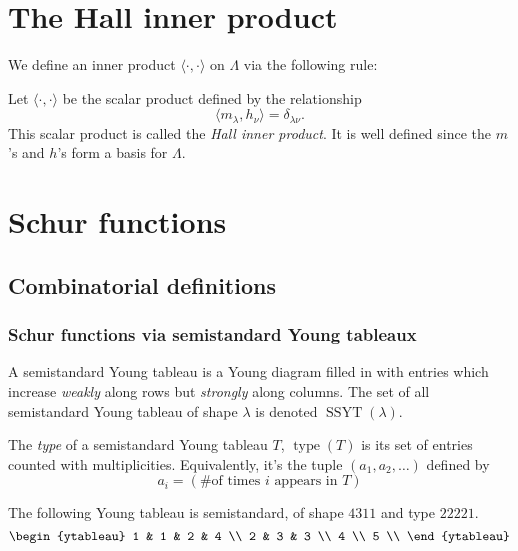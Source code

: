 \documentclass{article}
\DeclareMathOperator{\type}{type}
\DeclareMathOperator{\SSYT}{SSYT}
\begin{document}
\section{The Hall inner product}

We define an inner product $\langle \cdot, \cdot \rangle$ on $\Lambda$ via the following rule:

\begin{definition} Let $\langle\cdot,\cdot\rangle$ be the scalar product defined by the relationship
    \[
        \langle m_\lambda, h_\nu \rangle = \delta_{\lambda\nu}.
    \]
    This scalar product is called the \textit{Hall inner product}. It is well defined since the $m$'s and $h$'s form a basis for $\Lambda$.
\end{definition}

\section{Schur functions}
\subsection{Combinatorial definitions}
\subsubsection{Schur functions via semistandard Young tableaux}

\begin{definition}
    A semistandard Young tableau is a Young diagram filled in with entries which increase \textit{weakly} along rows but \textit{strongly} along columns. 
    The set of all semistandard Young tableau of shape $\lambda$ is denoted $\SSYT(\lambda)$.

    The \textit{type} of a semistandard Young tableau $T$, $\type(T)$ is its set of entries counted with multiplicities. Equivalently, it's the tuple $(a_1, a_2, \ldots)$ defined by
    \[
        a_i = (\#\text{of times }i\text{ appears in }T)
    \]
\end{definition}

\begin{example}
    The following Young tableau is semistandard, of shape $4311$ and type $22221$.
    \[
        \begin{ytableau}
            1 & 1 & 2 & 4 \\
            2 & 3 & 3  \\
            4 \\
            5 \\ 
        \end{ytableau}
    \]
\end{example}
\end{document}
